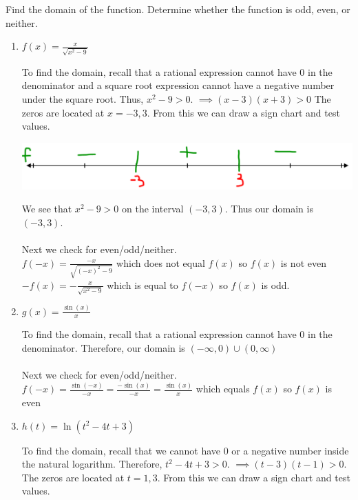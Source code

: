 \documentclass[nooutcomes, noinstructornotes]{ximera}
\begin{document}
\begin{problem}
Find the domain of the function.  Determine whether the function is odd, even, or neither.

\begin{enumerate}
	\item $f(x)=\frac{x}{\sqrt{x^2-9}}$
		\begin{freeResponse}
			To find the domain, recall that a rational expression cannot have $0$ in the denominator and a square root expression cannot have a negative number under the square root.  Thus, $x^2-9>0$.
			$\implies (x-3)(x+3)>0$  The zeros are located at $x=-3,3$.  From this we can draw a sign chart and test values.
		\begin{image}		
	\includegraphics[scale=0.2]{Figure9.png}
	\end{image}
		We see that $x^2-9>0$ on the interval $(-3,3)$.  Thus our domain is $(-3,3)$.\\ \\

		Next we check for even/odd/neither.\\
		$f(-x)=\frac{-x}{\sqrt{(-x)^2-9}}$ which does not equal $f(x)$ so $f(x)$ is not even\\
		$-f(x)=-\frac{x}{\sqrt{x^2-9}}$ which is equal to $f(-x)$ so $f(x)$ is odd.
		
		\end{freeResponse}

	\item $g(x)= \frac{\sin(x)}{x}$
		\begin{freeResponse}
	To find the domain, recall that a rational expression cannot have $0$ in the denominator.  Therefore, our domain is $(-\infty,0) \cup (0,\infty)$\\ \\
	
	Next we check for even/odd/neither.\\
		$f(-x)= \frac{\sin(-x)}{-x}=\frac{-\sin(x)}{-x}=\frac{\sin(x)}{x}$ which equals $f(x)$ so $f(x)$ is even


		\end{freeResponse}

	\item $h(t)= \ln(t^2-4t+3)$

		\begin{freeResponse}
		To find the domain, recall that we cannot have $0$ or a negative number inside the natural logarithm.  Therefore, $t^2-4t+3>0$.
			$\implies (t-3)(t-1)>0$.  The zeros are located at $t=1,3$.  From this we can draw a sign chart and test values.


\end{freeResponse}
\end{enumerate}
\end{problem}
\end{document}
